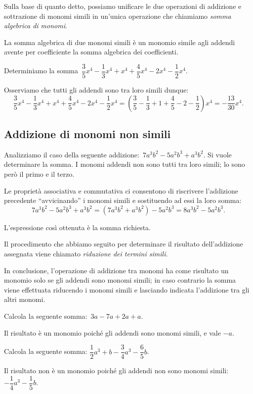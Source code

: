 Sulla base di quanto detto, possiamo unificare le due operazioni di
addizione e sottrazione di monomi simili in un'unica
operazione che chiamiamo \emph{somma algebrica di monomi}.

\osservazione La somma algebrica di due monomi simili è un monomio simile agli
addendi avente per coefficiente la somma algebrica dei coefficienti.

\begin{exrig}
 \begin{esempio}
Determiniamo la somma~$\dfrac{3}{5}x^{{4}}-\dfrac{1}{3}x^{{4}}+x^{{4}}+\dfrac{4}{5}x^{{4}}-2x^{{4}}-\dfrac{1}{2}x^{{4}}$.

Osserviamo che tutti gli addendi sono tra loro simili dunque:
\[\frac{3}{5}x^{{4}}-\frac{1}{3}x^{{4}}+x^{{4}}+\frac{4}{5}x^{{4}}-2x^{{4}}-\frac{1}{2}x^{{4}}=\left(\frac{3}{5}-\frac{1}{3}+1+\frac{4}{5}-2-\frac{1}{2}\right)x^{{4}}=-{\frac{13}{30}}x^{{4}}.\]
\end{esempio}
\end{exrig}
\subsection{Addizione di monomi non simili}

Analizziamo il caso della seguente
addizione:~$7a^{3}b^{2}-5a^{2}b^{3}+a^{3}b^{2}$. Si vuole determinare
la somma. I monomi addendi non sono tutti tra loro simili; lo sono
però il primo e il terzo.

Le proprietà associativa e commutativa ci consentono di riscrivere
l'addizione precedente
``avvicinando'' i monomi simili e
sostituendo ad essi la loro
somma:
\[7a^{3}b^{2}-5a^{2}b^{3}+a^{3}b^{2}=(7a^{3}b^{2}+a^{3}b^{2})-5a^{2}b^{3}=8a^{3}b^{2}-5a^{2}b^{3}.\]

L'espressione così ottenuta è la somma richiesta.

\vspazio\ovalbox{\risolvi \ref{ese:10.24}}\vspazio

Il procedimento che abbiamo seguito per determinare il risultato
dell'addizione assegnata viene chiamato
\emph{riduzione dei termini simili}.

In conclusione, l'operazione di addizione tra monomi ha
come risultato un monomio solo se gli addendi sono monomi simili; in
caso contrario la somma viene effettuata riducendo i monomi simili e
lasciando indicata l'addizione tra gli altri monomi.

\begin{exrig}
 \begin{esempio}
Calcola la seguente somma:~$3a-7a+2a+a$.

Il risultato è un monomio poiché gli addendi sono monomi
simili, e vale $-a$.
 \end{esempio}

 \begin{esempio}
Calcola la seguente somma:
$\dfrac{1}{2}a^{3}+b-\dfrac{3}{4}a^{3}-\dfrac{6}{5}b$.

Il risultato non è un monomio poiché gli addendi non sono
monomi simili: $-{\dfrac{1}{4}}a^{3}-\dfrac{1}{5}b$.
 \end{esempio}
\end{exrig}

